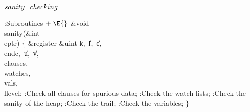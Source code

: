 \Y\B\4\D$\\{sanity\_checking}$ \5
\par
\Y\B\4:Subroutines\X${}\mathrel+\E{}$\6
\&{void} \\{sanity}(\&{int} \\{eptr})\1\1\2\2\6
${}\{{}$\1\6
\&{register} \&{uint} \|k${},{}$ \|l${},{}$ \|c${},{}$ \\{endc}${},{}$ %
\|u${},{}$ \|v${},{}$ \\{clauses}${},{}$ \\{watches}${},{}$ \\{vals}${},{}$ %
\\{llevel};\7
:Check all clauses for spurious data\X;\6
:Check the watch lists\X;\6
:Check the sanity of the heap\X;\6
:Check the trail\X;\6
:Check the variables\X;\6
\4${}\}{}$\2\par
\fi

